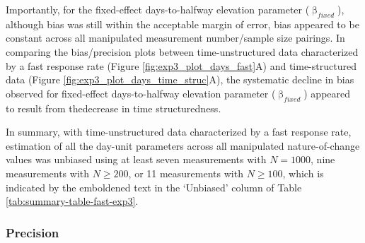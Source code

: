 \documentclass[
12pt, %
twoside,
english]{guelphthesis}
\begin{document}
\noindent Importantly, for the fixed-effect days-to-halfway elevation parameter (\(\upbeta_{fixed}\)), although bias was still within the acceptable margin of error, bias appeared to be constant across all manipulated measurement number/sample size pairings. In comparing the bias/precision plots between time-unstructured data characterized by a fast response rate (Figure \ref{fig:exp3_plot_days_fast}A) and time-structured data (Figure \ref{fig:exp3_plot_days_time_struc}A), the systematic decline in bias observed for fixed-effect days-to-halfway elevation parameter (\(\upbeta_{fixed}\)) appeared to result from thedecrease in time structuredness.

In summary, with time-unstructured data characterized by a fast response rate, estimation of all the day-unit parameters across all manipulated nature-of-change values was unbiased using at least seven measurements with \(N = 1000\), nine measurements with \(N \ge 200\), or 11 measurements with \(N \ge 100\), which is indicated by the emboldened text in the `Unbiased' column of Table \ref{tab:summary-table-fast-exp3}.

\hypertarget{precision-fast-exp3}{%
\subsubsection{Precision}\label{precision-fast-exp3}}
\end{document}
